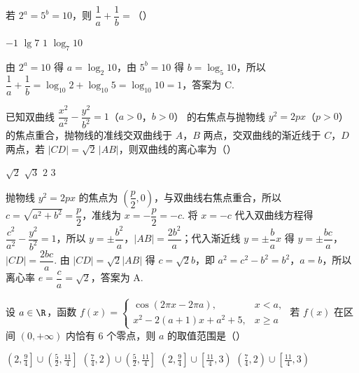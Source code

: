 \begin{problem}
若 \( 2^a=5^b=10 \)，则 \( \dfrac{1}{a}+\dfrac{1}{b}= \)（\quad）

\choices
    {\(-1\)}
    {\(\lg 7\)}
    {\(1\)}
    {\(\log_{7}10\)}
\end{problem}


\begin{solution}
由 \(2^a=10\) 得 \(a=\log_{2}10\)，由 \(5^b=10\) 得 \(b=\log_{5}10\)，所以 \(\dfrac1a+\dfrac1b=\log_{10}2+\log_{10}5=\log_{10}10=1\)，答案为 C.
\end{solution}

\begin{problem}
已知双曲线 \( \dfrac{x^2}{a^2}-\dfrac{y^2}{b^2}=1 \)（\(a>0\)，\(b>0\)） 的右焦点与抛物线 \( y^2=2px \)（\(p>0\)） 的焦点重合，抛物线的准线交双曲线于 \(A\)，\(B\) 两点，交双曲线的渐近线于 \(C\)，\(D\) 两点，若 \( |CD|=\sqrt2\,|AB| \)，则双曲线的离心率为（\quad）

\choices
    {\(\sqrt2\)}
    {\(\sqrt3\)}
    {\(2\)}
    {\(3\)}
\end{problem}


\begin{solution}
抛物线 \(y^2=2px\) 的焦点为 \(\left(\dfrac p2,0\right)\)，与双曲线右焦点重合，所以 \(c=\sqrt{a^2+b^2}=\dfrac p2\)，准线为 \(x=-\dfrac p2=-c\). 将 \(x=-c\) 代入双曲线方程得 \(\dfrac{c^2}{a^2}-\dfrac{y^2}{b^2}=1\)，所以 \(y=\pm\dfrac{b^2}a\)，\(|AB|=\dfrac{2b^2}a\)；代入渐近线 \(y=\pm\dfrac bax\) 得 \(y=\pm\dfrac{bc}a\)，\(|CD|=\dfrac{2bc}a\). 由 \(|CD|=\sqrt2|AB|\) 得 \(c=\sqrt2b\)，即 \(a^2=c^2-b^2=b^2\)，\(a=b\)，所以离心率 \(e=\dfrac ca=\sqrt2\)，答案为 A.
\end{solution}

\begin{problem}
设 \( a\in \R \)，函数
\( f(x)=\begin{cases}
\cos\left( 2\pi x-2\pi a \right), & x<a,\\
x^2-2(a+1)x+a^2+5, & x\ge a
\end{cases} \)
若 \( f(x) \) 在区间 \( \left( 0,+\infty \right) \) 内恰有 \( 6 \) 个零点，则 \( a \) 的取值范围是（\quad）

\choices
    {\(\left( 2,\frac{9}{4} \right]\cup \left( \frac{5}{2},\frac{11}{4} \right]\)}
    {\(\left( \frac{7}{4},2 \right)\cup \left( \frac{5}{2},\frac{11}{4} \right]\)}
    {\(\left( 2,\frac{9}{4} \right]\cup \left[ \frac{11}{4},3 \right)\)}
    {\(\left( \frac{7}{4},2 \right)\cup \left[ \frac{11}{4},3 \right)\)}
\end{problem}

